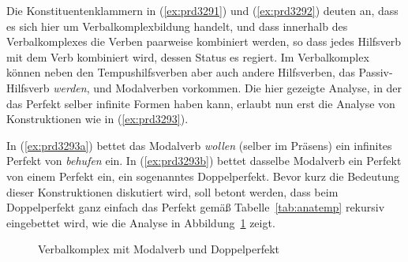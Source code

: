 Die Konstituentenklammern in (\ref{ex:prd3291}) und (\ref{ex:prd3292}) deuten an, dass es sich hier um Verbalkomplexbildung handelt, und dass innerhalb des Verbalkomplexes die Verben paarweise kombiniert werden, so dass jedes Hilfsverb mit dem Verb kombiniert wird, dessen Status es regiert.
Im Verbalkomplex können neben den Tempushilfsverben aber auch andere Hilfsverben, \zB das Passiv-Hilfsverb \textit{werden}, und Modalverben vorkommen.
Die hier gezeigte Analyse, in der das Perfekt selber infinite Formen haben kann, erlaubt nun erst die Analyse von Konstruktionen wie in (\ref{ex:prd3293}).

\begin{exe}
  \ex\label{ex:prd3293} 
  \begin{xlist}
  \end{xlist}
\end{exe}


In (\ref{ex:prd3293a}) bettet das Modalverb \textit{wollen} (selber im Präsens) ein infinites Perfekt von \textit{behufen} ein.
In (\ref{ex:prd3293b}) bettet dasselbe Modalverb ein Perfekt von einem Perfekt ein, ein sogenanntes Doppelperfekt.
Bevor kurz die Bedeutung dieser Konstruktionen diskutiert wird, soll betont werden, dass beim Doppelperfekt ganz einfach das Perfekt gemäß Tabelle~\ref{tab:anatemp} rekursiv eingebettet wird, wie die Analyse in Abbildung~\ref{fig:perfektvk} zeigt.

\begin{figure}
  \caption{Verbalkomplex mit Modalverb und Doppelperfekt}
  \label{fig:perfektvk}
\end{figure}

